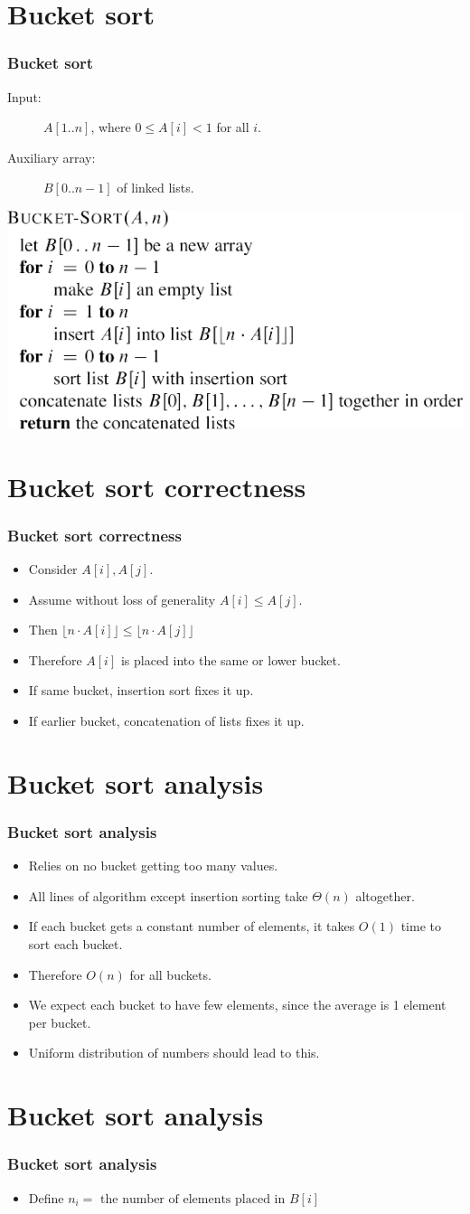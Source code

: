 \documentclass{beamer}
\newcommand{\bi}{\begin{itemize}}
\newcommand{\ei}{\end{itemize}}
\newcommand{\sect}[1]{
\section{#1}
\begin{frame}[fragile]\frametitle{#1}
}
\begin{document}
\sect{Bucket sort}

\begin{description}
\item[Input:] $A[1..n]$, where $0 \leq A[i] < 1$ for all $i$.
\item[Auxiliary array:] $B[0..n-1]$ of linked lists.
\end{description}
\vfill
\includegraphics{Bucket-Sort.pdf}
\end{frame}

\sect{Bucket sort correctness}

\bi
\item
  Consider $A[i], A[j]$.
\item
  Assume without loss of generality $A[i] \leq A[j]$.
\item
  Then $\lfloor n\cdot A[i]\rfloor \leq\lfloor n\cdot A[j]\rfloor$
\item
  Therefore $A[i]$ is placed into the same or lower bucket.
\item
  If same bucket, insertion sort fixes it up.
\item
  If earlier bucket, concatenation of lists fixes it up.
  \ei
  

\end{frame}

\sect{Bucket sort analysis}
\bi
\item Relies on no bucket getting too many values.
\item
  All lines of algorithm except insertion sorting take $\Theta(n)$ altogether.
\item
  If each bucket gets a constant number of elements, it takes $O(1)$
  time to sort each bucket.
\item
  Therefore  $O(n)$ for all buckets.
\item
  We expect each bucket to have few elements, since the average is 1
  element per bucket.
\item
  Uniform distribution of numbers should lead to this.
  \ei
\end{frame}

\sect{Bucket sort analysis}
\bi
\item Define $n_i = \mbox{ the number of elements placed in } B[i]$

\ei

\end{frame}
\end{document}
